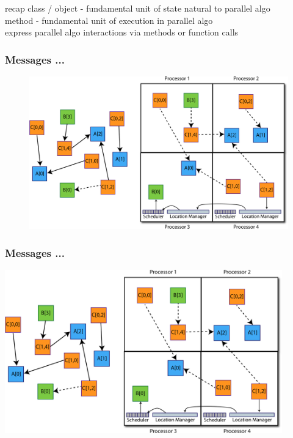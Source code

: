 \begin{frame}
recap
    class / object - fundamental unit of state natural to parallel algo\\
    method - fundamental unit of execution in parallel algo\\
    express parallel algo interactions via methods or function calls
\end{frame}


\begin{frame}
  \frametitle{Messages ...
  }
  \begin{figure}
  \includegraphics[trim=0in 0in 14in 2in, clip=true, height=0.85\textheight]{../figures/elements2.pdf}
  \end{figure}
\end{frame}


\begin{frame}
  \frametitle{Messages ...
  }
  \begin{center}\includegraphics[width=0.9\textwidth]{../figures/elements2.pdf}\end{center}
\end{frame}



